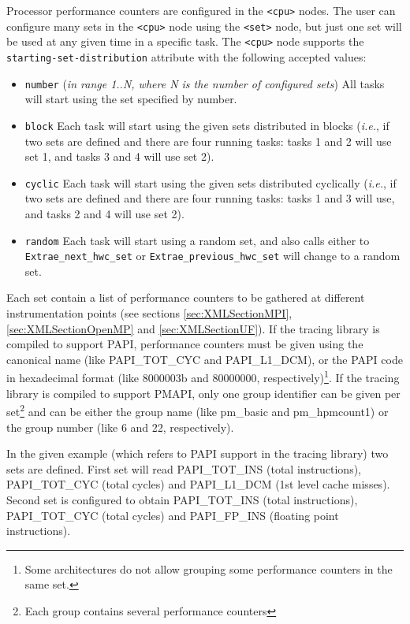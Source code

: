 Processor performance counters are configured in the {\tt <cpu>} nodes. The user can configure many sets in the {\tt <cpu>} node using the {\tt <set>} node, but just one set will be used at any given time in a specific task. The {\tt <cpu>} node supports the {\tt starting-set-distribution} attribute with the following accepted values:

\begin{itemize}
 \item {\tt number} ({\em in range 1..N, where N is the number of configured sets}) All tasks will start using the set specified by number.
 \item {\tt block} Each task will start using the given sets distributed in blocks ({\em i.e.}, if two sets are defined and there are four running tasks: tasks 1 and 2 will use set 1, and tasks 3 and 4 will use set 2).
 \item {\tt cyclic} Each task will start using the given sets distributed cyclically ({\em i.e.}, if two sets are defined and there are four running tasks: tasks 1 and 3 will use, and tasks 2 and 4 will use set 2).
 \item {\tt random} Each task will start using a random set, and also calls either to {\tt Extrae\_next\_hwc\_set} or {\tt Extrae\_previous\_hwc\_set} will change to a random set.
\end{itemize}

Each set contain a list of performance counters to be gathered at different instrumentation points (see sections \ref{sec:XMLSectionMPI}, \ref{sec:XMLSectionOpenMP} and \ref{sec:XMLSectionUF}). If the tracing library is compiled to support PAPI, performance counters must be given using the canonical name (like PAPI\_TOT\_CYC and PAPI\_L1\_DCM), or the PAPI code in hexadecimal format (like 8000003b and 80000000, respectively)\footnote{Some architectures do not allow grouping some performance counters in the same set.}. If the tracing library is compiled to support PMAPI, only one group identifier can be given per set\footnote{Each group contains several performance counters} and can be either the group name (like pm\_basic and pm\_hpmcount1) or the group number (like 6 and 22, respectively). 

In the given example (which refers to PAPI support in the tracing library) two sets are defined. First set will read {PAPI\_TOT\_INS} (total instructions), {PAPI\_TOT\_CYC} (total cycles) and {PAPI\_L1\_DCM} (1st level cache misses). Second set is configured to obtain {PAPI\_TOT\_INS} (total instructions), {PAPI\_TOT\_CYC} (total cycles) and {PAPI\_FP\_INS} (floating point instructions).

